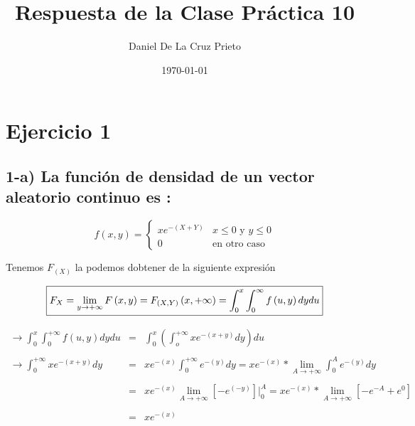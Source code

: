 \documentclass[12pt]{article}
\begin{document}
	\title{Respuesta de la Clase Pr\'actica 10}
	\author{Daniel De La Cruz Prieto}
	\date{\today}
	
    \maketitle
    
    \section*{Ejercicio 1 } 


    \subsection*{ 1-a) La funci\'on de densidad de un vector aleatorio continuo es :}

    \begin{equation*}
        f\left(x,y\right) = \begin{cases}
    
        xe^{-\left(X+Y\right)} & \mbox{$x\leq0$ y $y\leq 0$}
        \\
               0             & \mbox{en otro caso}
    
       \end{cases}
    \end{equation*}


    \begin{flushleft}
        Tenemos $F_{\left(X\right)}$ la podemos dobtener de la siguiente expresi\'on
    \end{flushleft}

   	\begin{equation*} 
	    \fbox{$
	   	F_{X} =  \displaystyle \lim_{y \to + \infty} F\left(x,y\right) = \displaystyle  F_{\left(X,Y\right)} \left(x,+\infty\right) = \int_{0}^{x}\int_{0}^\infty f\left(u,y\right) dy du	   	
	   	$}
    \end{equation*} 

	\begin{equation*} 
	    \begin{array}{rcl}
	        \to\int_{0}^{x} \int_{0}^{+\infty} f \left(u,y\right) dy du & = &  \int_{0}^{x} \left(\int_{o}^{+ \infty}xe^{-\left(x + y\right)} dy\right)du
	        \\
	        \\
	        \to \int_{0}^{+ \infty} xe^{-\left(x+y\right)}dy & = & xe ^{-\left(x\right)} \int_{0}^{+ \infty} e^{-\left(y\right)}dy = \displaystyle xe^{-\left(x\right)} * \lim_{A\to + \infty} \int_{0}^{A} e^{-\left(y\right)} dy
	        \\
	        \\
	        & = &\displaystyle xe^{-\left(x\right)}  \lim_{A\to+\infty} \left[ -e^{\left(-y\right)}\right]\vert_{0}^{A}   = \displaystyle xe^{-\left(x\right)}* \lim_{A\to+\infty} \left[ -e^{-A} + e^0\right]
	        \\
	        \\
            & = & xe^{-\left(x\right)}
            \\
	    \end{array}
    \end{equation*}        
  
\end{document}
